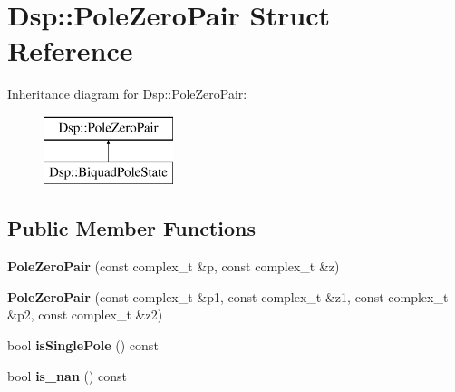 \hypertarget{structDsp_1_1PoleZeroPair}{\section{Dsp\-:\-:Pole\-Zero\-Pair Struct Reference}
\label{structDsp_1_1PoleZeroPair}
}
Inheritance diagram for Dsp\-:\-:Pole\-Zero\-Pair\-:\begin{figure}[H]
\begin{center}
\leavevmode
\includegraphics[height=2.000000cm]{structDsp_1_1PoleZeroPair}
\end{center}
\end{figure}
\subsection*{Public Member Functions}
\begin{DoxyCompactItemize}
\item 
\hypertarget{structDsp_1_1PoleZeroPair_a6d0e26bade98aa03713f4efa9cb54419}{{\bfseries Pole\-Zero\-Pair} (const complex\-\_\-t \&p, const complex\-\_\-t \&z)}\label{structDsp_1_1PoleZeroPair_a6d0e26bade98aa03713f4efa9cb54419}

\item 
\hypertarget{structDsp_1_1PoleZeroPair_af3c12183d644e008485e674cbfe5d727}{{\bfseries Pole\-Zero\-Pair} (const complex\-\_\-t \&p1, const complex\-\_\-t \&z1, const complex\-\_\-t \&p2, const complex\-\_\-t \&z2)}\label{structDsp_1_1PoleZeroPair_af3c12183d644e008485e674cbfe5d727}

\item 
\hypertarget{structDsp_1_1PoleZeroPair_ab93214803f749b5d84ea4be936eb192e}{bool {\bfseries is\-Single\-Pole} () const }\label{structDsp_1_1PoleZeroPair_ab93214803f749b5d84ea4be936eb192e}

\item 
\hypertarget{structDsp_1_1PoleZeroPair_a3eb3091fd2752d6ec1b12859d64ddabe}{bool {\bfseries is\-\_\-nan} () const }\label{structDsp_1_1PoleZeroPair_a3eb3091fd2752d6ec1b12859d64ddabe}

\end{DoxyCompactItemize}

